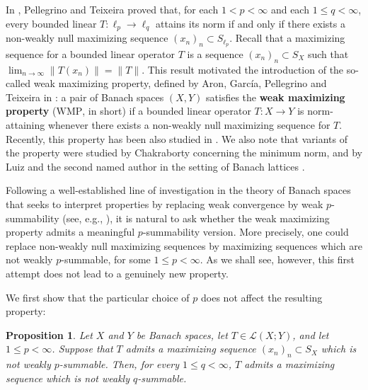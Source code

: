 \documentclass[12 pt]{article}%
\newtheorem{proposition}[theorem]{Proposition}
\newtheorem{final remark}[theorem]{Final Remark}
\newcommand{\norma}[1]{\| #1 \|}
\begin{document}
In \cite{danieleduardo}, Pellegrino and Teixeira proved that, for each $1 < p < \infty$ and each $1 \leq q < \infty$, every bounded linear $T: \ell_p \to \ell_q$ attains its norm if and only if there exists a non-weakly null maximizing sequence $(x_n)_n \subset S_{\ell_p}$. Recall that a maximizing sequence for a bounded linear operator $T$ is a sequence $(x_n)_n \subset S_X$ such that $\displaystyle \lim_{n \to \infty} \norma{T(x_n)} = \norma{T}$.  This result motivated the introduction of the so-called weak maximizing property, defined by Aron, García, Pellegrino and Teixeira in \cite{arongarciapelteix}: a pair of Banach spaces $(X, Y)$ satisfies the {\bf weak maximizing property} ($\mathrm{WMP}$, in short) if a bounded linear operator $T: X \to Y$ is norm-attaining whenever there exists a non-weakly null maximizing sequence for $T$. Recently, this property has been also studied in \cite{dantasjung, garcia-lirola, jung, miranda}. We also note that variants of the property were studied by Chakraborty \cite{cha} concerning the minimum norm, and by Luiz and the second named author in the setting of Banach lattices \cite{luizmiranda}.
 






Following a well-established line of investigation in the theory of Banach spaces that seeks to interpret properties by replacing weak convergence by weak $p$-summability (see, e.g., \cite{castillo, P-Schur, zeefou14, coarse, karnsinha2, sinhakarn}), it is natural to ask whether the weak maximizing property admits a meaningful $p$-summability version. More precisely, one could replace non-weakly null maximizing sequences by maximizing sequences which are not weakly $p$-summable, for some $1\leq p<\infty$. As we shall see, however, this first attempt does not lead to a genuinely new property. 


We first show that the particular choice of $p$ does not affect the resulting property:



\begin{proposition}\label{primeiro}
Let $X$ and $Y$ be Banach spaces, let $T\in\mathcal L(X;Y)$, and let
$1\leq p<\infty$. Suppose that $T$ admits a maximizing sequence
$(x_n)_n\subset S_X$ which is not weakly $p$-summable. Then, for every
$1\leq q<\infty$, $T$ admits a maximizing sequence which is
not weakly $q$-summable.
\end{proposition}
\end{document}
